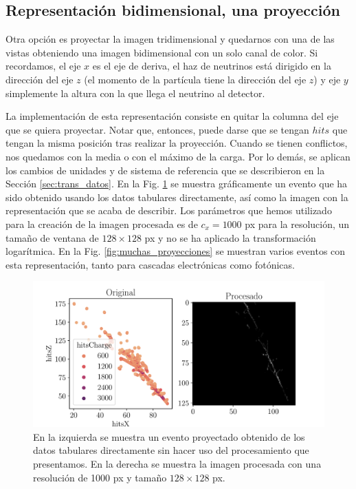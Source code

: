 \documentclass[a4paper,12pt,oneside,titlepage]{book}
\begin{document}
\subsection*{Representación bidimensional, una proyección}

Otra opción es proyectar la imagen tridimensional y quedarnos con una de las vistas obteniendo una imagen bidimensional con un solo canal de color. Si recordamos, el eje $x$ es el eje de deriva, el haz de neutrinos está dirigido en la dirección del eje $z$ (el momento de la partícula tiene la dirección del eje $z$) y eje $y$ simplemente la altura con la que llega el neutrino al detector.

La implementación de esta representación consiste en quitar la columna del eje que se quiera proyectar. Notar que, entonces, puede darse que se tengan $hits$ que tengan la misma posición tras realizar la proyección. Cuando se tienen conflictos, nos quedamos con la media o con el máximo de la carga. Por lo demás, se aplican los cambios de unidades y de sistema de referencia que se describieron en la Sección \ref{sec:trans_datos}. En la Fig. \ref{fig:varias_proyecciones} se muestra gráficamente un evento que ha sido obtenido usando los datos tabulares directamente, así como la imagen con la representación que se acaba de describir. Los parámetros que hemos utilizado para la creación de la imagen procesada es de $c_x = 1000$ px para la resolución, un tamaño de ventana de $128\times 128$ px y no se ha aplicado la transformación logarítmica. En la Fig. \ref{fig:muchas_proyecciones} se muestran varios eventos con esta representación, tanto para cascadas electrónicas como fotónicas.

\begin{figure}[h!]
  \centering
  \includegraphics[scale=0.85, center]{ambas_pro.pdf}
  \caption{En la izquierda se muestra un evento proyectado obtenido de los datos tabulares directamente sin hacer uso del procesamiento que presentamos. En la derecha se muestra la imagen procesada con una resolución de 1000 px y tamaño $128\times128$ px.}
  \label{fig:varias_proyecciones}
\end{figure}
\end{document}
